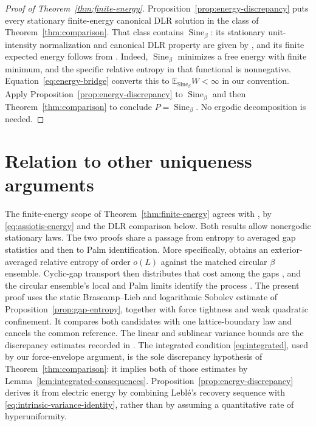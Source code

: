 \documentclass[11pt,reqno]{amsart}
\numberwithin{equation}{section}
\theoremstyle{definition}
\theoremstyle{remark}
\newcommand{\E}{\mathbb E}
\newcommand{\1}{\mathbf 1}
\newcommand{\Sine}{\operatorname{Sine}}
\begin{document}
\begin{proof}[Proof of Theorem~\ref{thm:finite-energy}]
Proposition~\ref{prop:energy-discrepancy} puts every stationary
finite-energy canonical DLR solution in the class of
Theorem~\ref{thm:comparison}. That class contains $\Sine_\beta$:
its stationary unit-intensity normalization and canonical DLR
property are given by \cite[Theorem~2.1]{DHLM}, and its finite
expected energy follows from \cite[Corollary~1.2]{LS}.
Indeed, $\Sine_\beta$ minimizes a free energy with finite minimum,
and the specific relative entropy in that functional is nonnegative.
Equation~\eqref{eq:energy-bridge} converts this to
$\E_{\Sine_\beta}W<\infty$ in our convention.
Apply Proposition~\ref{prop:energy-discrepancy} to $\Sine_\beta$
and then Theorem~\ref{thm:comparison} to conclude $P=\Sine_\beta$.
No ergodic decomposition is needed.
\end{proof}


\section{Relation to other uniqueness arguments}

The finite-energy scope of Theorem~\ref{thm:finite-energy} agrees with
\cite[Theorem~1.1]{Assiotis}, by \eqref{eq:assiotis-energy} and the
DLR comparison below. Both results allow nonergodic stationary laws.
The two proofs share a passage from entropy to averaged gap statistics
and then to Palm identification. More specifically,
\cite[Proposition~7.3]{Assiotis} obtains an exterior-averaged relative
entropy of order $o(L)$ against the matched circular $\beta$ ensemble.
Cyclic-gap transport then distributes that cost among the gaps
\cite[Lemma~8.3]{Assiotis}, and the circular ensemble's local and Palm
limits identify the process \cite[Sections~8.3--8.6]{Assiotis}.
The present proof uses the static Brascamp--Lieb and logarithmic Sobolev
estimate of Proposition~\ref{prop:gap-entropy}, together with force
tightness and weak quadratic confinement. It compares both candidates
with one lattice-boundary law and cancels the common reference.
The linear and sublinear variance bounds are the discrepancy estimates
recorded in \cite[Proposition~2.7]{Assiotis}. The integrated condition
\eqref{eq:integrated}, used by our force-envelope argument, is the sole
discrepancy hypothesis of Theorem~\ref{thm:comparison}: it implies
both of those estimates by Lemma~\ref{lem:integrated-consequences}.
Proposition~\ref{prop:energy-discrepancy} derives it from electric
energy by combining Lebl\'e's recovery sequence with
\eqref{eq:intrinsic-variance-identity}, rather than by assuming a
quantitative rate of hyperuniformity.
\end{document}
